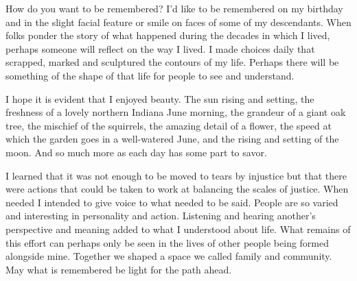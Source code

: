 How do you want to be remembered?
I'd like to be remembered on my birthday and in the slight facial feature or smile on faces of some of my descendants.
When folks ponder the story of what happened during the decades in which I lived, perhaps someone will reflect on the way I lived.
I made choices daily that scrapped, marked and sculptured the contours of my life.
Perhaps there will be something of the shape of that life for people to see and understand.

I hope it is evident that I enjoyed beauty.
The sun rising and setting, the freshness of a lovely northern Indiana June morning, the grandeur of a giant oak tree, the mischief of the squirrels, the amazing detail of a flower, the speed at which the garden goes in a well-watered June, and the rising and setting of the moon.
And so much more as each day has some part to savor.

I learned that it was not enough to be moved to tears by injustice but that there were actions that could be taken to work at balancing the scales of justice.
When needed I intended to give voice to what needed to be said.
People are so varied and interesting in personality and action.
Listening and hearing another's perspective and meaning added to what I understood about life.
What remains of this effort can perhaps only be seen in the lives of other people being formed alongside mine.
Together we shaped a space we called family and community.
May what is remembered be light for the path ahead.






